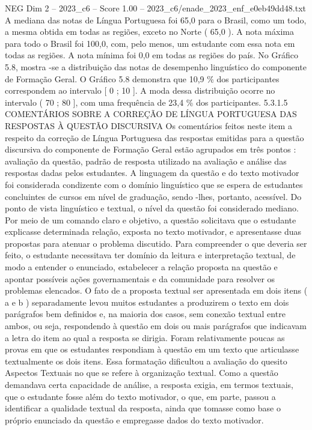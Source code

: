 \begin{textsample}{NEG Dim 2 – 2023\_c6 – Score 1.00 – 2023\_c6/enade\_2023\_enf\_e0eb49dd48.txt}
A mediana das notas de Língua Portuguesa foi 65,0 para o Brasil, como um todo, a mesma obtida em todas as regiões, exceto no Norte ( 65,0 ).
A nota máxima para todo o Brasil foi 100,0, com, pelo menos, um estudante com essa nota em todas as regiões.
A nota mínima foi 0,0 em todas as regiões do país.
No Gráfico 5.8, mostra -se a distribuição das notas de desempenho linguístico do componente de Formação Geral.
O Gráfico 5.8 demonstra que 10,9 \% dos participantes correspondem ao intervalo [ 0 ; 10 ].
A moda dessa distribuição ocorre no intervalo ( 70 ; 80 ], com uma frequência de 23,4 \% dos participantes. 5.3.1.5 COMENTÁRIOS SOBRE A CORREÇÃO DE LÍNGUA PORTUGUESA DAS RESPOSTAS À QUESTÃO DISCURSIVA Os comentários feitos neste item a respeito da correção de Língua Portuguesa das respostas emitidas para a questão discursiva do componente de Formação Geral estão agrupados em três pontos : avaliação da questão, padrão de resposta utilizado na avaliação e análise das respostas dadas pelos estudantes.
A linguagem da questão e do texto motivador foi considerada condizente com o domínio linguístico que se espera de estudantes concluintes de cursos em nível de graduação, sendo -lhes, portanto, acessível.
Do ponto de vista linguístico e textual, o nível da questão foi considerado mediano.
Por meio de um comando claro e objetivo, a questão solicitava que o estudante explicasse determinada relação, exposta no texto motivador, e apresentasse duas propostas para atenuar o problema discutido.
Para compreender o que deveria ser feito, o estudante necessitava ter domínio da leitura e interpretação textual, de modo a entender o enunciado, estabelecer a relação proposta na questão e apontar possíveis ações governamentais e da comunidade para resolver os problemas elencados.
O fato de a proposta textual ser apresentada em dois itens ( a e b ) separadamente levou muitos estudantes a produzirem o texto em dois parágrafos bem definidos e, na maioria dos casos, sem conexão textual entre ambos, ou seja, respondendo à questão em dois ou mais parágrafos que indicavam a letra do item ao qual a resposta se dirigia.
Foram relativamente poucas as provas em que os estudantes respondiam à questão em um texto que articulasse textualmente os dois itens.
Essa formatação dificultou a avaliação do quesito Aspectos Textuais no que se refere à organização textual.
Como a questão demandava certa capacidade de análise, a resposta exigia, em termos textuais, que o estudante fosse além do texto motivador, o que, em parte, passou a identificar a qualidade textual da resposta, ainda que tomasse como base o próprio enunciado da questão e empregasse dados do texto motivador.

\end{textsample}
